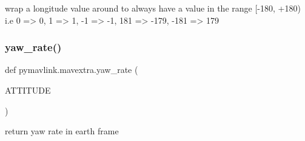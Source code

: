\begin{DoxyVerb}wrap a longitude value around to always have a value in the range
    [-180, +180) i.e 0 => 0, 1 => 1, -1 => -1, 181 => -179, -181 => 179
\end{DoxyVerb}
 \mbox{\label{namespacepymavlink_1_1mavextra_af1b42c28fc778624954bc9bb5307fcf6}} 
\subsubsection{\texorpdfstring{yaw\+\_\+rate()}{yaw\_rate()}}
{\footnotesize\ttfamily def pymavlink.\+mavextra.\+yaw\+\_\+rate (\begin{DoxyParamCaption}\item[{}]{A\+T\+T\+I\+T\+U\+DE }\end{DoxyParamCaption})}

\begin{DoxyVerb}return yaw rate in earth frame\end{DoxyVerb}
 